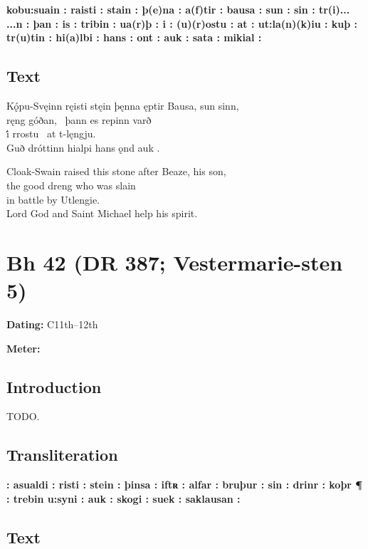 \textbf{kobu:suain : raisti : stain : þ(e)na : a(f)tir : bausa : sun : sin : tr(i)... ...n : þan : is : tribin : ua(r)þ : i : (u)(r)ostu : at : ut:la(n)(k)iu : kuþ : tr(u)tin : hi(a)lbi : hans : ont : auk : sata : mikial :}

\subsection{Text}

\bpg\bpa[0]%
\startsub Kǫ́pu-Svęinn ręisti stęin þęnna ęptir Bausa, sun sinn,\endsub \\
ręng góðan, \hld\ þann es repinn varð \\
i̇́ rrostu \hld\ at t-lęngju. \\
Guð dróttinn hialpi hans ǫnd auk .\epa

\bpb Cloak-Swain raised this stone after Beaze, his son, \\
the good dreng who was slain \\
in battle by Utlengie. \\
Lord God and Saint Michael help his spirit.\epb\epg


\section{Bh 42 (DR 387; Vestermarie-sten 5)}

\begin{flushright}%
\textbf{Dating:} C11th--12th

\textbf{Meter:} \Ljodahattr
\end{flushright}%

\subsection{Introduction}

TODO.

\subsection{Transliteration}

\textbf{: asualdi : risti : stein : þinsa : iftʀ : alfar : bruþur : sin : drinr : koþr ¶ : trebin u:syni : auk : skogi : suek : saklausan :}

\subsection{Text}

